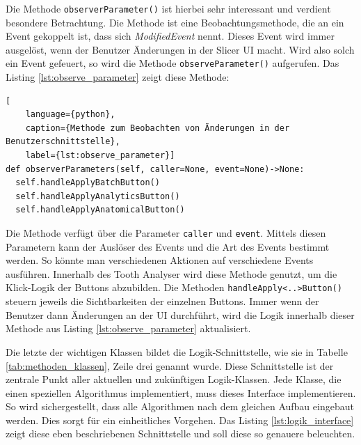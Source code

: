 Die Methode \texttt{observerParameter()} ist hierbei sehr interessant und verdient
besondere Betrachtung. Die Methode ist eine Beobachtungsmethode, die an ein Event
gekoppelt ist, dass sich \textit{ModifiedEvent} nennt. Dieses Event wird immer
ausgelöst, wenn der Benutzer Änderungen in der Slicer \ac{UI} macht. Wird also solch
ein Event gefeuert, so wird die Methode \texttt{observeParameter()} aufgerufen.
Das Listing \ref{lst:observe_parameter} zeigt diese Methode:

\begin{lstlisting}[
    language={python},
    caption={Methode zum Beobachten von Änderungen in der Benutzerschnittstelle},
    label={lst:observe_parameter}]
def observerParameters(self, caller=None, event=None)->None:
  self.handleApplyBatchButton()
  self.handleApplyAnalyticsButton()
  self.handleApplyAnatomicalButton()
\end{lstlisting}

Die Methode verfügt über die Parameter \texttt{caller} und \texttt{event}.
Mittels diesen Parametern kann der Auslöser des Events und die Art des Events
bestimmt werden. So könnte man verschiedenen Aktionen auf verschiedene Events ausführen.
Innerhalb des Tooth Analyser wird diese Methode genutzt, um die Klick-Logik der Buttons
abzubilden. Die Methoden \texttt{handleApply<..>Button()} steuern jeweils die Sichtbarkeiten
der einzelnen Buttons. Immer wenn der Benutzer dann Änderungen an der \ac{UI} durchführt,
wird die Logik innerhalb dieser Methode aus Listing \ref{lst:observe_parameter}
aktualisiert.

Die letzte der wichtigen Klassen bildet die Logik-Schnittstelle, wie sie in Tabelle
\ref{tab:methoden_klassen}, Zeile drei genannt wurde. Diese Schnittstelle ist der
zentrale Punkt aller aktuellen und zukünftigen Logik-Klassen. Jede Klasse, die einen
speziellen Algorithmus implementiert, muss dieses Interface implementieren. So wird
sichergestellt, dass alle Algorithmen nach dem gleichen Aufbau eingebaut werden.
Dies sorgt für ein einheitliches Vorgehen. Das Listing \ref{lst:logik_interface}
zeigt diese eben beschriebenen Schnittstelle und soll diese so genauere
beleuchten.

\pagebreak

